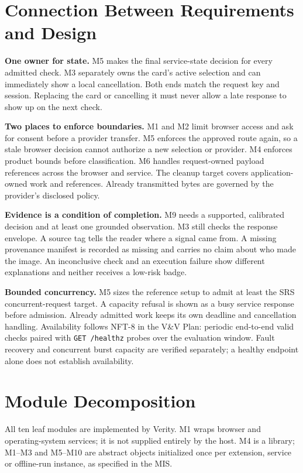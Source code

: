 \documentclass[12pt, titlepage]{article}
\begin{document}
\section{Connection Between Requirements and Design} \label{SecConnection}

\textbf{One owner for state.} M5 makes the final service-state decision for every admitted check. M3 separately owns the card's active selection and can immediately show a local cancellation. Both ends match the request key and session. Replacing the card or cancelling it must never allow a late response to show up on the next check.

\textbf{Two places to enforce boundaries.} M1 and M2 limit browser access and ask for consent before a provider transfer. M5 enforces the approved route again, so a stale browser decision cannot authorize a new selection or provider. M4 enforces product bounds before classification. M6 handles request-owned payload references across the browser and service. The cleanup target covers application-owned work and references. Already transmitted bytes are governed by the provider's disclosed policy.

\textbf{Evidence is a condition of completion.} M9 needs a supported, calibrated decision and at least one grounded observation. M3 still checks the response envelope. A source tag tells the reader where a signal came from. A missing provenance manifest is recorded as missing and carries no claim about who made the image. An inconclusive check and an execution failure show different explanations and neither receives a low-risk badge.

\textbf{Bounded concurrency.} M5 sizes the reference setup to admit at least the SRS concurrent-request target. A capacity refusal is shown as a busy service response before admission. Already admitted work keeps its own deadline and cancellation handling. Availability follows NFT-8 in the V\&V Plan: periodic end-to-end valid checks paired with \texttt{GET /healthz} probes over the evaluation window. Fault recovery and concurrent burst capacity are verified separately; a healthy endpoint alone does not establish availability.

\section{Module Decomposition} \label{SecMD}

All ten leaf modules are implemented by Verity. M1 wraps browser and operating-system services; it is not supplied entirely by the host. M4 is a library; M1--M3 and M5--M10 are abstract objects initialized once per extension, service or offline-run instance, as specified in the MIS.
\end{document}
